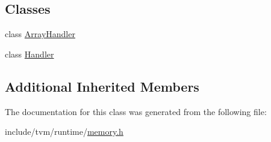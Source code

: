 \subsection*{Classes}
\begin{DoxyCompactItemize}
\item 
class \hyperlink{classtvm_1_1runtime_1_1SimpleObjAllocator_1_1ArrayHandler}{Array\+Handler}
\item 
class \hyperlink{classtvm_1_1runtime_1_1SimpleObjAllocator_1_1Handler}{Handler}
\end{DoxyCompactItemize}
\subsection*{Additional Inherited Members}


The documentation for this class was generated from the following file\+:\begin{DoxyCompactItemize}
\item 
include/tvm/runtime/\hyperlink{runtime_2memory_8h}{memory.\+h}\end{DoxyCompactItemize}
